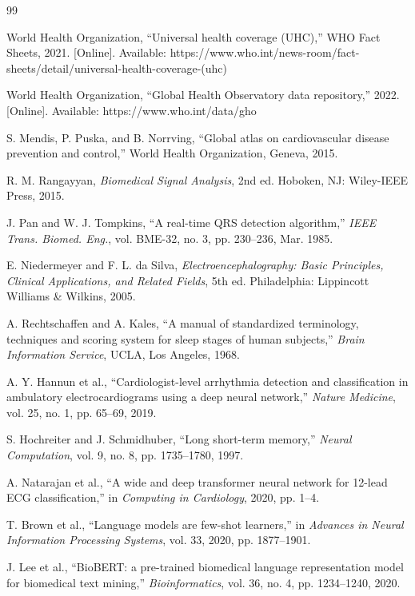 \documentclass[conference]{IEEEtran}
\begin{document}
\begin{thebibliography}{99}

World Health Organization, ``Universal health coverage (UHC),'' WHO Fact Sheets, 2021. [Online]. Available: https://www.who.int/news-room/fact-sheets/detail/universal-health-coverage-(uhc)

World Health Organization, ``Global Health Observatory data repository,'' 2022. [Online]. Available: https://www.who.int/data/gho

S. Mendis, P. Puska, and B. Norrving, ``Global atlas on cardiovascular disease prevention and control,'' World Health Organization, Geneva, 2015.

R. M. Rangayyan, \textit{Biomedical Signal Analysis}, 2nd ed. Hoboken, NJ: Wiley-IEEE Press, 2015.

J. Pan and W. J. Tompkins, ``A real-time QRS detection algorithm,'' \textit{IEEE Trans. Biomed. Eng.}, vol. BME-32, no. 3, pp. 230--236, Mar. 1985.

E. Niedermeyer and F. L. da Silva, \textit{Electroencephalography: Basic Principles, Clinical Applications, and Related Fields}, 5th ed. Philadelphia: Lippincott Williams \& Wilkins, 2005.

A. Rechtschaffen and A. Kales, ``A manual of standardized terminology, techniques and scoring system for sleep stages of human subjects,'' \textit{Brain Information Service}, UCLA, Los Angeles, 1968.

A. Y. Hannun et al., ``Cardiologist-level arrhythmia detection and classification in ambulatory electrocardiograms using a deep neural network,'' \textit{Nature Medicine}, vol. 25, no. 1, pp. 65--69, 2019.

S. Hochreiter and J. Schmidhuber, ``Long short-term memory,'' \textit{Neural Computation}, vol. 9, no. 8, pp. 1735--1780, 1997.

A. Natarajan et al., ``A wide and deep transformer neural network for 12-lead ECG classification,'' in \textit{Computing in Cardiology}, 2020, pp. 1--4.

T. Brown et al., ``Language models are few-shot learners,'' in \textit{Advances in Neural Information Processing Systems}, vol. 33, 2020, pp. 1877--1901.

J. Lee et al., ``BioBERT: a pre-trained biomedical language representation model for biomedical text mining,'' \textit{Bioinformatics}, vol. 36, no. 4, pp. 1234--1240, 2020.


\end{thebibliography}
\end{document}
